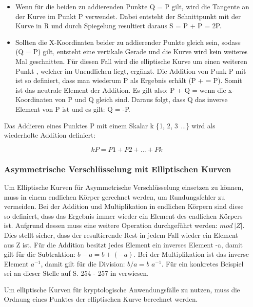 		\begin{itemize}
			\item Wenn für die beiden zu addierenden Punkte Q = P gilt, wird die Tangente an der Kurve im Punkt P verwendet. Dabei entsteht der Schnittpunkt mit der Kurve in R und durch Spiegelung resultiert daraus S = P + P = 2P.
			\item Sollten die X-Koordinaten beider zu addierender Punkte gleich sein, sodass (Q = P) gilt, entsteht eine vertikale Gerade und die Kurve wird kein weiteres Mal geschnitten. Für diesen Fall wird die elliptische Kurve um einen weiteren Punkt \myInftyOhne, welcher im Unendlichen liegt, ergänzt. Die Addition von Punk P mit \myInfty ist so definiert, dass man wiederum P als Ergebnis erhält (P + \myInfty = P). Somit ist \myInfty das neutrale Element der Addition. Es gilt also: P + Q = \myInfty wenn die x-Koordinaten von P und Q gleich sind. Daraus folgt, dass Q das inverse Element von P ist und es gilt: Q = -P.
		\end{itemize}
		
		Das Addieren eines Punktes P mit einem Skalar k \myin \{1, 2, 3 ...\} wird als wiederholte Addition definiert:
		
		\begin{displaymath}
			kP = P1 + P2 + ... + Pk
		\end{displaymath}

		\subsubsection{Asymmetrische Verschlüsselung mit Elliptischen Kurven}
			Um Elliptische Kurven für Asymmetrische Verschlüsselung einsetzen zu können, muss in einem endlichen Körper gerechnet werden, um Rundungsfehler zu vermeiden. Bei der Addition und Multiplikation in endlichen Körpern sind diese so definiert, dass das Ergebnis immer wieder ein Element des endlichen Körpers ist. Aufgrund dessen muss eine weitere Operation durchgeführt werden: $mod~|Z|$. Dies stellt sicher, dass der resultierende Rest in jedem Fall wieder ein Element aus Z ist. Für die Addition besitzt jedes Element ein inverses Element -a, damit gilt für die Subtraktion: $b - a = b + (-a)$. Bei der Multiplikation ist das inverse Element $a^{-1}$, damit gilt für die Division: $b / a = b$ \mycdot $a^{-1}$. Für ein konkretes Beispiel sei an dieser Stelle auf S. 254 - 257 in \cite{Information:und:Kommunikation} verwiesen.
			
			Um elliptische Kurven für kryptologische Anwendungsfälle zu nutzen, muss die Ordnung eines Punktes der elliptischen Kurve berechnet werden.
			
